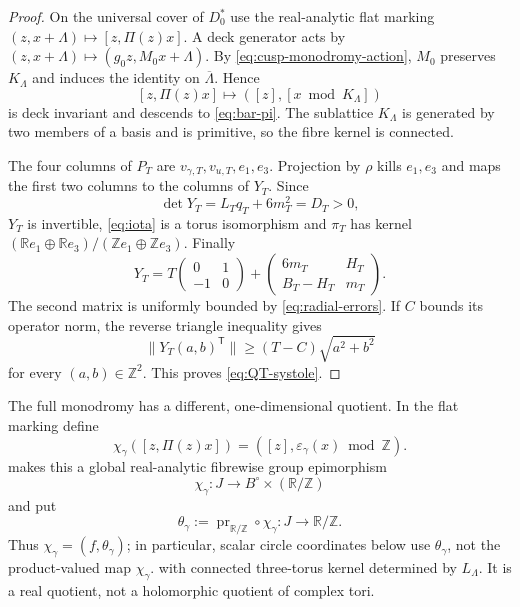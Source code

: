 \documentclass[11pt,letterpaper]{article}
\numberwithin{equation}{section}
\theoremstyle{definition}
\theoremstyle{remark}
\newcommand{\R}{\mathbb R}
\newcommand{\Z}{\mathbb Z}
\begin{document}
\begin{proof}
On the universal cover of $D_0^*$ use the real-analytic flat marking
$(z,x+\Lambda)\mapsto[z,\Pi(z)x]$.  A deck generator acts by
$(z,x+\Lambda)\mapsto(g_0z,M_0x+\Lambda)$.  By
\cref{eq:cusp-monodromy-action}, $M_0$ preserves $K_\Lambda$ and induces
the identity on $\overline\Lambda$.  Hence
\[
 [z,\Pi(z)x]\longmapsto([z],[x\bmod K_\Lambda])
\]
is deck invariant and descends to \cref{eq:bar-pi}.  The sublattice
$K_\Lambda$ is generated by two members of a basis and is primitive, so
the fibre kernel is connected.

The four columns of $P_T$ are
$v_{\gamma,T},v_{u,T},e_1,e_3$.  Projection by $\rho$ kills $e_1,e_3$
and maps the first two columns to the columns of $Y_T$.  Since
\begin{equation}
 \det Y_T=L_Tq_T+6m_T^2=D_T>0,
 \label{eq:Y-determinant}
\end{equation}
$Y_T$ is invertible, \cref{eq:iota} is a torus isomorphism and $\pi_T$
has kernel
$(\R e_1\oplus\R e_3)/(\Z e_1\oplus\Z e_3)$.  Finally
\begin{equation}
 Y_T=T\begin{pmatrix}0&1\\-1&0\end{pmatrix}
 +\begin{pmatrix}6m_T&H_T\\B_T-H_T&m_T\end{pmatrix}.
 \label{eq:Y-asymptotic}
\end{equation}
The second matrix is uniformly bounded by \cref{eq:radial-errors}.  If
$C$ bounds its operator norm, the reverse triangle inequality gives
\[
 \|Y_T(a,b)^{\mathsf T}\|\ge(T-C)\sqrt{a^2+b^2}
\]
for every $(a,b)\in\Z^2$.  This proves \cref{eq:QT-systole}.
\end{proof}

The full monodromy has a different, one-dimensional quotient.  In the flat
marking define
\begin{equation}
 \chi_\gamma([z,\Pi(z)x])=
 ([z],\varepsilon_\gamma(x)\bmod\Z).
 \label{eq:global-character}
\end{equation}
 makes this a global
real-analytic fibrewise group epimorphism
\begin{equation}
 \chi_\gamma:J\longrightarrow B^\circ\times(\R/\Z)
 \label{eq:global-circle-map}
\end{equation}
and put
\begin{equation}
 \theta_\gamma:=\operatorname{pr}_{\R/\Z}\circ\chi_\gamma:
 J\longrightarrow\R/\Z.
 \label{eq:global-circle-coordinate}
\end{equation}
Thus \(\chi_\gamma=(f,\theta_\gamma)\); in particular, scalar circle
coordinates below use \(\theta_\gamma\), not the product-valued map
\(\chi_\gamma\).
with connected three-torus kernel determined by $L_\Lambda$.  It is a real
quotient, not a holomorphic quotient of complex tori.
\end{document}
